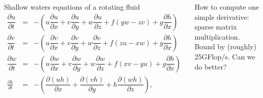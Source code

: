 \documentclass{beamer}
\begin{document}
\begin{frame}
\begin{columns}
    \begin{block}{Shallow waters equations of a rotating fluid}
      \tiny
      \begin{eqnarray}
        \dfrac{\partial u}{\partial t} &=& - \left( u\dfrac{\partial u}{\partial x} + v\dfrac{\partial u}{\partial y} + w\dfrac{\partial u}{\partial z} + f(yw - zv) + g\dfrac{\partial h}{\partial x} \right) 
        \nonumber \\
        \dfrac{\partial v}{\partial t} &=& - \left( u\dfrac{\partial v}{\partial x} + v\dfrac{\partial v}{\partial y} + w\dfrac{\partial v}{\partial z} + f(zu - xw) + g\dfrac{\partial h}{\partial x} \right)
        \nonumber\\
        \dfrac{\partial w}{\partial t} &=& - \left( u\dfrac{\partial w}{\partial x} + v\dfrac{\partial w}{\partial y} + w\dfrac{\partial w}{\partial z} + f(xv - yu) + g\dfrac{\partial h}{\partial x} \right)
        \nonumber\\
        \frac{\partial h}{\partial t}& =&-\left(\dfrac{\partial (uh)}{\partial x} + \dfrac{\partial (vh)}{\partial y} + h\dfrac{\partial (wh)}{\partial z}\right) , \label{height} \nonumber
      \end{eqnarray}
    \end{block}

    How to compute one simple derivative: sparse matrix
    multiplication. Bound by (roughly) 25GFlop/s. Can we do better?
  \end{columns}
\end{frame}
\end{document}
